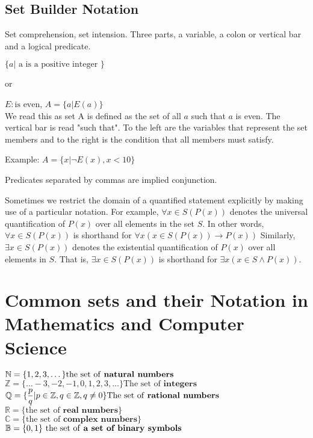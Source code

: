      \subsection {Set Builder Notation}
Set comprehension, set intension. Three parts, a variable, a colon or vertical bar and a logical predicate.  


$\{a | \text{  a is a positive integer }\} $

or 

$E: \text{is even}$, 
$A= \{a | E(a)\}$\\
We read this as 
set A is defined as the set of all $a$ such that $a$ is even. The vertical bar is read "such that". To the left are the variables that represent the set members and to the right is the condition that all members must satisfy.

Example: $A = \{x | \lnot E(x),x<10\}  $

\begin{notes}
Predicates separated by commas are implied conjunction.
\end{notes}
  
Sometimes we restrict the domain of a quantified statement explicitly by making use of a particular notation. For example, $\forall x \in S (P(x))$       %
denotes the universal quantification of $P(x)$ over all elements in the set $S$. In other words, $\forall x \in S (P(x))$  is shorthand for $\forall x (x \in S(P(x)) \rightarrow P(x))$    
Similarly, $\exists x \in S(P(x))$ denotes the existential quantification of $P(x)$ over all elements in $S$. That is, $\exists x \in S(P(x))$ is shorthand for $\exists x (x \in S \land P(x))$.


\section {Common sets and their Notation in Mathematics and Computer Science}
 $\mathbb{N}=\{1,2,3, \dots \} \text {the set of \textbf{natural numbers} } $ \\
 $\mathbb{Z}=\{\dots -3,-2,-1,0,1,2,3, \dots\}  \text{The set of } \textbf{integers}$ \\
 $\mathbb{Q}=\{\dfrac{p}{q} | p \in \mathbb{Z}, q \in \mathbb{Z}, q \neq 0 \} \text{The set of \textbf{rational numbers}}$ \\
 $\mathbb{R}=\{ \text{the set of }\textbf{real numbers}   \} $ \\
 $\mathbb{C}=\{ \text{the set of }\textbf{complex numbers} \} $ \\
 $\mathbb{B}=\{0,1\} \text{ the set of \textbf{a set of binary symbols} } $ \\
 





